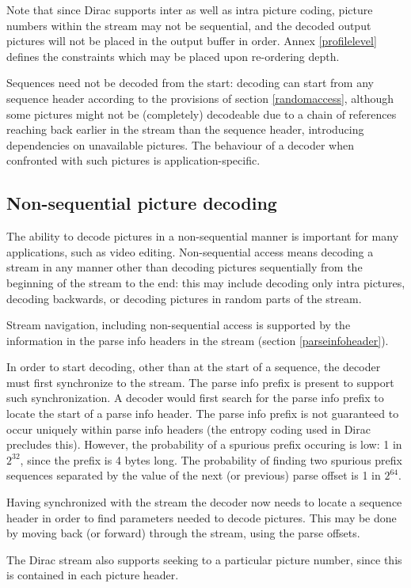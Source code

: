 Note that since Dirac supports inter as well as intra picture coding, picture numbers
within the stream may not be sequential, and the decoded output pictures will not be
placed in the output buffer in order. Annex \ref{profilelevel} defines the constraints
which may be placed upon re-ordering depth.

Sequences need not be decoded from the start: decoding can start from any sequence header
according to the provisions of section \ref{randomaccess}, although some pictures might
not be (completely) decodeable due to a chain of references reaching back earlier in the stream
than the sequence header, introducing dependencies on unavailable pictures. 
The behaviour of a decoder when confronted with such pictures is application-specific.

\subsection{Non-sequential picture decoding}

The ability to decode pictures in a non-sequential manner is important for many
 applications, such as video editing. Non-sequential access means decoding a 
stream in any manner other than decoding pictures sequentially from the beginning 
of the stream to the end: this may include decoding only intra pictures, decoding backwards, or decoding pictures in random parts of the stream. 

Stream navigation, including non-sequential access is supported by the information 
in the parse info headers in the stream (section \ref{parseinfoheader}). 

In order to start decoding, other than at the start of a sequence, the decoder 
must first synchronize to the stream. The parse info prefix is present to support such synchronization. A decoder would first search for the parse info prefix to locate 
the start of a parse info header. The parse info prefix is not guaranteed to occur
 uniquely within parse info headers (the entropy coding used in 
Dirac precludes this). However, the probability of a spurious 
prefix occuring is low: 1 in $2^{32}$, since the prefix is 4 bytes long. The probability of finding 
two spurious prefix sequences separated by the value of the next (or previous) parse 
offset is 1 in $2^{64}$.  

Having synchronized with the stream the decoder now needs to locate a sequence header 
in order to find parameters needed to decode pictures. This may be done by moving back (or forward) through the stream, using the parse offsets.

The Dirac stream also supports seeking to a particular picture number, since this
is contained in each picture header.

